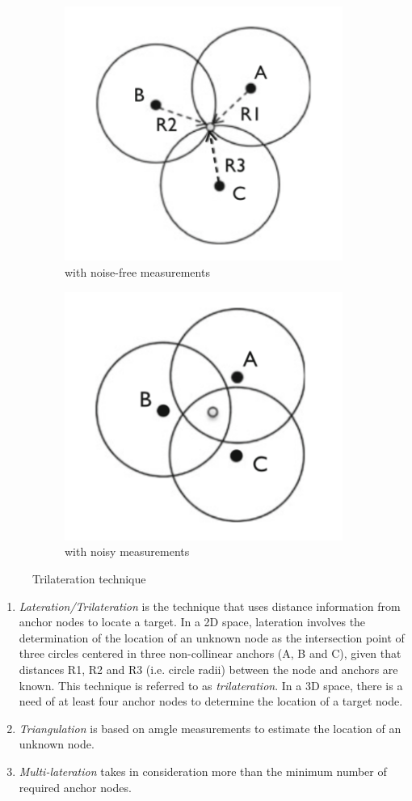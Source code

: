 \documentclass[a4paper,12pt]{article}
\begin{document}
\begin{enumerate}
  \begin{figure}[b]
    \centering
    \begin{subfigure}{.5\textwidth}
      \centering
      \includegraphics[width=.4\linewidth]{img/noise-free-lateration}
      \caption{with noise-free measurements}
    \end{subfigure}%
    \begin{subfigure}{.5\textwidth}
      \centering
      \includegraphics[width=.4\linewidth]{img/lateration}
      \caption{with noisy measurements}
    \end{subfigure}
    \caption{Trilateration technique}
  \end{figure}

  \begin{enumerate}[label=(\roman*)]
    \item \textit{Lateration/Trilateration} is the technique that uses distance information from anchor nodes to locate a target. In a 2D space, lateration involves the determination of the location of an unknown node as the intersection point of three circles centered in three non-collinear anchors (A, B and C), given that distances R1, R2 and R3 (i.e. circle radii) between the node and anchors are known. This technique is referred to as \textit{trilateration}. In a 3D space, there is a need of at least four anchor nodes to determine the location of a target node.
    \item \textit{Triangulation} is based on amgle measurements to estimate the location of an unknown node.
    \item \textit{Multi-lateration} takes in consideration more than the minimum number of required anchor nodes.
  \end{enumerate}
\end{enumerate}
\end{document}

